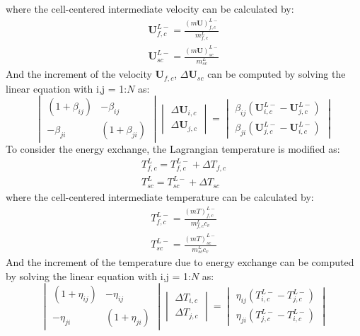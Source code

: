\documentclass[preprint,12pt]{elsarticle}
\begin{document}
%
%
where the cell-centered intermediate velocity can be calculated by:
%
\begin{equation}
\begin{gathered}
\pmb{U}_{f,c}^{L-} = \frac{(m \pmb{U})_{f,c}^{L-}}{m_{f,c}^L} \\
\pmb{U}_{sc}^{L-} = \frac{(m \pmb{U})_{sc}^{L-}}{m_{sc}^L} 
\end {gathered}
\end {equation}
%
%
And the increment of the velocity $\pmb{U}_{f,c}$, $\Delta \pmb{U}_{sc}$ can be computed by solving the linear equation with i,j = 1:$N$ as:
%
%
\[ \begin{vmatrix} (1 + \beta_{ij})  &  -\beta_{ij} \\
                  -\beta_{ji}       &  (1 + \beta_{ji})
    \end {vmatrix}
    \begin{vmatrix} \Delta \pmb{U}_{i,c} \\
                    \Delta \pmb{U}_{j,c}
    \end {vmatrix}
    =
    \begin{vmatrix}  \beta_{ij}(\pmb{U}_{i,c}^{L-} - \pmb{U}_{j,c}^{L-}) \\
                    \beta_{ji}(\pmb{U}_{j,c}^{L-} - \pmb{U}_{i,c}^{L-})
    \end {vmatrix}                
\]
%
%
To consider the energy exchange, the Lagrangian temperature  is modified as:
%
\begin{equation}
\begin{gathered}
T_{f,c}^{L} = T_{f,c}^{L-} + \Delta T_{f,c} \\
T_{sc}^{L} = T_{sc}^{L-} + \Delta T_{sc}
\end {gathered}
\end {equation}
%
%
where the cell-centered intermediate temperature can be calculated by:
%
\begin{equation}
\begin{gathered}
T_{f,c}^{L-} = \frac{(m T)_{f,c}^{L-}}{m_{f,c}^L c_v} \\
T_{sc}^{L-} = \frac{(m T)_{sc}^{L-}}{m_{sc}^L c_v} 
\end {gathered}
\end {equation}
%
%
And the increment of the temperature due to energy exchange can be computed by solving the linear equation with i,j = 1:$N$ as:
%
%
\[ \begin{vmatrix} (1 + \eta_{ij})  &  -\eta_{ij} \\
                  -\eta_{ji}       &  (1 + \eta_{ji})
    \end {vmatrix}
    \begin{vmatrix} \Delta T_{i,c} \\
                    \Delta T_{j,c}
    \end {vmatrix}
    =
    \begin{vmatrix}  \eta_{ij}(T_{i,c}^{L-} - T_{j,c}^{L-}) \\
                    \eta_{ji}(T_{j,c}^{L-} - T_{i,c}^{L-})
    \end {vmatrix}                
\]
\end{document}
